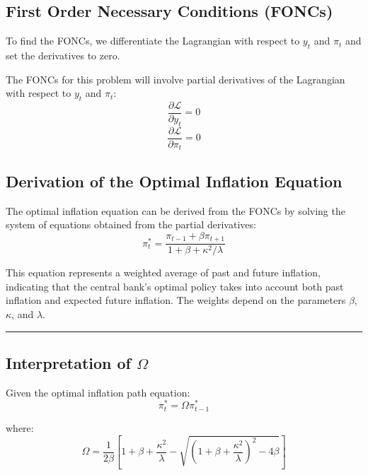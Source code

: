 \documentclass{article}
\begin{document}
\subsection{First Order Necessary Conditions (FONCs)}

To find the FONCs, we differentiate the Lagrangian with respect to \( y_t \) and \( \pi_t \) and set the derivatives to zero.

The FONCs for this problem will involve partial derivatives of the Lagrangian with respect to \( y_t \) and \( \pi_t \):
\[ \frac{\partial \mathcal{L}}{\partial y_t} = 0 \]
\[ \frac{\partial \mathcal{L}}{\partial \pi_t} = 0 \]

\subsection{Derivation of the Optimal Inflation Equation}

The optimal inflation equation can be derived from the FONCs by solving the system of equations obtained from the partial derivatives:
\[ \pi^*_t = \frac{\pi_{t-1} + \beta \pi_{t+1}}{1 + \beta + \kappa^2 / \lambda} \]

This equation represents a weighted average of past and future inflation, indicating that the central bank's optimal policy takes into account both past inflation and expected future inflation. The weights depend on the parameters \( \beta \), \( \kappa \), and \( \lambda \).

\noindent\rule{\linewidth}{0.5pt}

\subsection{Interpretation of \(\Omega\)}

Given the optimal inflation path equation:
\[ \pi^*_t = \Omega \pi^*_{t-1} \]

where:
\[ \Omega = \frac{1}{2\beta} \left[ 1 + \beta + \frac{\kappa^2}{\lambda} - \sqrt{\left(1 + \beta + \frac{\kappa^2}{\lambda}\right)^2 - 4\beta} \right] \]
\end{document}
